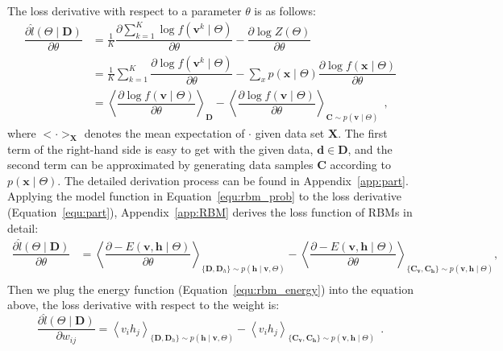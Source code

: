 The loss derivative with respect to a parameter $\theta$ is as follows:
\begin{equation}
\label{equ:part}
\begin{aligned}
\dfrac{\partial \hat{l} (\Theta \mid \mathbf{D})}{\partial \theta} 
& = \frac{1}{K} \dfrac{\partial \sum_{k=1}^K\log f(\mathbf{v}^k \mid \Theta )}{\partial \theta} - \dfrac{\partial \log Z( \Theta)}{\partial \theta}\\
& =  \frac{1}{K}\sum_{k=1}^K \dfrac{\partial \log f(\mathbf{v}^k \mid \Theta)}{\partial \theta} - \sum_x p(\mathbf{x} \mid \Theta) \dfrac{\partial \log f(\mathbf{x} \mid \Theta)}{\partial \theta}\\
& = \left \langle \dfrac{\partial \log f(\mathbf{v} \mid \Theta)}{\partial \theta}\right \rangle_{\mathbf{D}} -\left \langle \dfrac{\partial \log f(\mathbf{v} \mid \Theta)}{\partial \theta}\right \rangle_{\mathbf{C} \sim p(\mathbf{v} \mid \Theta)} ~~,
\end{aligned}
\end{equation}
where  $ <\cdot>_{\mathbf{X}} $ denotes the mean expectation of $ \cdot $ given data set $\mathbf{X}$.
The first term of the right-hand side is easy to get with the given data, $\mathbf{d} \in \mathbf{D} $, and the second term can be approximated by generating data samples $\mathbf{C} $ according to $ p(\mathbf{x} \mid \Theta) $.
The detailed derivation process can be found in Appendix~\ref{app:part}.
Applying the \protect{} model function \protect{} in Equation~\ref{equ:rbm_prob} to the loss derivative (Equation~\ref{equ:part}), Appendix~\ref{app:RBM} derives the loss function of RBMs in detail:
\begin{equation}
\label{equ:RBM}
\begin{aligned}
\dfrac{\partial \hat{l} (\Theta \mid \mathbf{D})}{\partial \theta} 
& = \left \langle \dfrac{\partial -E(\mathbf{v}, \mathbf{h} \mid \Theta)}{\partial \theta} \right \rangle_{\{\mathbf{D}, \mathbf{D}_h\} \sim p( \mathbf{h} \mid \mathbf{v}, \Theta)} 
- \left \langle \dfrac{\partial -E(\mathbf{v}, \mathbf{h} \mid \Theta)}{\partial \theta} \right \rangle_{\{\mathbf{C_v}, \mathbf{C_h}\} \sim p( \mathbf{v}, \mathbf{h} \mid  \Theta)},  \\
\end{aligned}
\end{equation}
Then we plug the \protect{} energy function \protect{} (Equation~\ref{equ:rbm_energy}) into the equation above, the loss derivative with respect to the weight is:
\begin{equation}
\label{equ:RBM_2}
\dfrac{\partial \hat{l} (\Theta \mid \mathbf{D})}{\partial w_{ij}} 
= \left \langle v_i h_j \right \rangle_{\{\mathbf{D}, \mathbf{D}_h\} \sim p( \mathbf{h} \mid \mathbf{v}, \Theta)}
- \left \langle  v_i h_j \right \rangle_{\{\mathbf{C_v}, \mathbf{C_h}\} \sim p( \mathbf{v}, \mathbf{h} \mid  \Theta)}~~. \end{equation}
